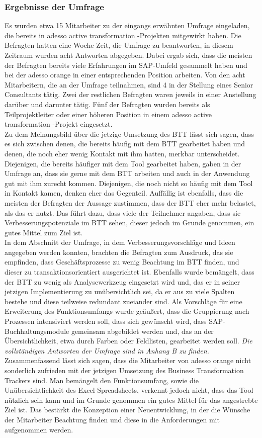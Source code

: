 \subsubsection{Ergebnisse der Umfrage}
Es wurden etwa 15 Mitarbeiter zu der eingangs erwähnten Umfrage eingeladen, die bereits in adesso active transformation -Projekten mitgewirkt haben. Die Befragten hatten eine Woche Zeit, die Umfrage zu beantworten, in diesem Zeitraum wurden acht Antworten abgegeben. Dabei ergab sich, dass die meisten der Befragten bereits viele Erfahrungen im SAP-Umfeld gesammelt haben und bei der adesso orange in einer entsprechenden Position arbeiten. Von den acht Mitarbeitern, die an der Umfrage teilnahmen, sind 4 in der Stellung eines Senior Consultants tätig. Zwei der restlichen Befragten waren jeweils in einer Anstellung darüber und darunter tätig. Fünf der Befragten wurden bereits als Teilprojektleiter oder einer höheren Position in einem adesso active transformation -Projekt eingesetzt. 
\\Zu dem Meinungsbild über die jetzige Umsetzung des BTT lässt sich sagen, dass es sich zwischen denen, die bereits häufig mit dem BTT gearbeitet haben und denen, die noch eher wenig Kontakt mit ihm hatten, merkbar unterscheidet. Diejenigen, die bereits häufiger mit dem Tool gearbeitet haben, gaben in der Umfrage an, dass sie gerne mit dem BTT arbeiten und auch in der Anwendung gut mit ihm zurecht kommen. Diejenigen, die noch nicht so häufig mit dem Tool in Kontakt kamen, denken eher das Gegenteil. Auffällig ist ebenfalls, dass die meisten der Befragten der Aussage zustimmen, dass der BTT eher mehr belastet, als das er nutzt. Das führt dazu, dass viele der Teilnehmer angaben, dass sie Verbesserungspotenziale im BTT sehen, dieser jedoch im Grunde genommen, ein gutes Mittel zum Ziel ist.\\
In dem Abschnitt der Umfrage, in dem Verbesserungsvorschläge und Ideen angegeben werden konnten, brachten die Befragten zum Ausdruck, das sie empfinden, dass Geschäftsprozesse zu wenig Beachtung im BTT finden, und dieser zu transaktionsorientiert ausgerichtet ist. Ebenfalls wurde bemängelt, dass der BTT zu wenig als Analysewerkzeug eingesetzt wird und, das er in seiner jetzigen Implementierung zu unübersichtlich sei, da er aus zu viele Spalten bestehe und diese teilweise redundant zueiander sind. Als Vorschläge für eine Erweiterung des Funktionsumfangs wurde geäußert, dass die Gruppierung nach Prozessen intensiviert werden soll, dass sich gewünscht wird, dass SAP-Buchhaltungsmodule gemeinsam abgebildet werden und, das an der Übersichtlichkeit, etwa durch Farben oder Feldlisten, gearbeitet werden soll. \emph{Die vollständigen Antworten der Umfrage sind in Anhang B zu finden.}
\\Zusammenfassend lässt sich sagen, dass die Mitarbeiter von adesso orange nicht sonderlich zufrieden mit der jetzigen Umsetzung des Business Transformation Trackers sind. Man bemängelt den Funktionsumfang, sowie die Unübersichtlichkeit des Excel-Spreadsheets, verkennt jedoch nicht, dass das Tool nützlich sein kann und im Grunde genommen ein gutes Mittel für das angestrebte Ziel ist. Das bestärkt die Konzeption einer Neuentwicklung, in der die Wünsche der Mitarbeiter Beachtung finden und diese in die Anforderungen mit aufgenommen werden. 

